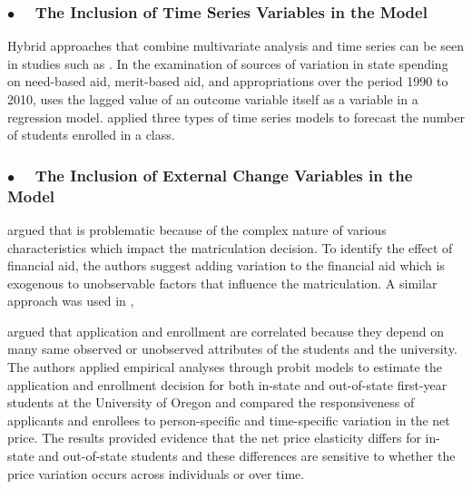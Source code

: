 \documentclass[12pt,english]{report}
\begin{document}


\subsubsection{$\bullet \quad$  The Inclusion of Time Series Variables in the Model} Hybrid approaches that combine multivariate analysis and time series can be seen in studies such as \citet{Heller1999}. In the examination of sources of variation in state spending on need-based aid, merit-based aid, and appropriations over the period 1990 to 2010, \citep{McLendon2014} uses the lagged value of an outcome variable itself as a variable in a regression model. \citep{Lavilles2012} applied three types of time series models to forecast the number of students enrolled in a class.

\subsubsection{$\bullet \quad$  The Inclusion of External Change Variables in the Model} 

\citet{Dynarski2003} argued that  is problematic because of the complex nature of various characteristics which impact the matriculation decision. To identify the effect of financial aid, the authors suggest adding variation to the financial aid which is exogenous to unobservable factors that influence the matriculation.  A similar approach was used in \citep{Dynarski2003, Abraham2006},

\citet{Curs2002} argued that application and enrollment are correlated because they depend on many  same observed or unobserved attributes of the students and the university.  The authors applied empirical analyses through probit models to estimate the application and enrollment decision for both in-state and out-of-state first-year students at the University of Oregon and compared the responsiveness of applicants and enrollees to person-specific and time-specific variation in the net price.   The results provided evidence that the net price elasticity differs for in-state and out-of-state students and these differences are sensitive to whether the price variation occurs across individuals or over time.
% 
% 
\end{document}
